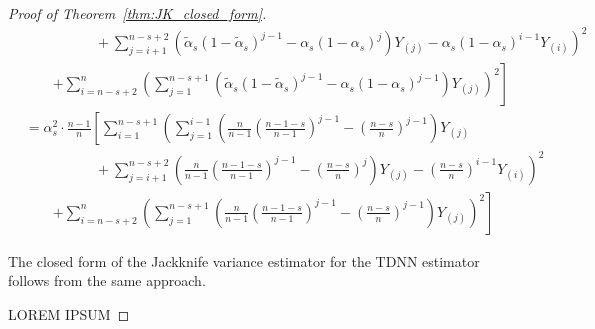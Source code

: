 \begin{proof}[Proof of Theorem~\ref{thm:JK_closed_form}]
\begin{equation}
\begin{aligned}
				& \quad \quad \quad \quad \quad +  \left.\sum_{j = i + 1}^{n - s + 2}\left(\tilde{\alpha}_{s}{\left(1 - \tilde{\alpha}_{s}\right)}^{j - 1} - \alpha_{s}{\left(1 - \alpha_{s}\right)}^{j}
				\right) Y_{(j)}
				-  \alpha_{s}{\left(1 - \alpha_{s}\right)}^{i - 1} Y_{(i)}
				\right)^2\\
				& \quad \quad \left. + \sum_{i = n - s + 2}^{n} {\left(\sum_{j = 1}^{n - s + 1} 
					\left(\tilde{\alpha}_{s}{\left(1 - \tilde{\alpha}_{s}\right)}^{j - 1} - \alpha_{s}{\left(1 - \alpha_{s}\right)}^{j - 1}
					\right) Y_{(j)}\right)}^2
				\right]\\
				& = \alpha_{s}^2 \cdot \frac{n - 1}{n} \left[
					\sum_{i = 1}^{n - s + 1} \left(
					\sum_{j = 1}^{i - 1}\left(\frac{n}{n-1}{\left(\frac{n - 1 - s}{n - 1}\right)}^{j - 1} - {\left(\frac{n - s}{n}\right)}^{j - 1}
					\right) Y_{(j)} \right. \right.\\
					& \quad \quad \quad \quad \quad +  \left.\sum_{j = i + 1}^{n - s + 2}\left(\frac{n}{n-1}{\left(\frac{n - 1 - s}{n - 1}\right)}^{j - 1} - {\left(\frac{n - s}{n}\right)}^{j}
					\right) Y_{(j)}
					-  {\left(\frac{n - s}{n}\right)}^{i - 1} Y_{(i)}
					\right)^2\\
					& \quad \quad \left. + \sum_{i = n - s + 2}^{n} {\left(\sum_{j = 1}^{n - s + 1} 
						\left(\frac{n}{n-1}{\left(\frac{n - 1 - s}{n - 1}\right)}^{j - 1} - {\left(\frac{n - s}{n}\right)}^{j - 1}
						\right) Y_{(j)}\right)}^2
					\right]
		\end{aligned}
	\end{equation}

	The closed form of the Jackknife variance estimator for the TDNN estimator follows from the same approach.

		{\color{red} LOREM IPSUM}
\end{proof}